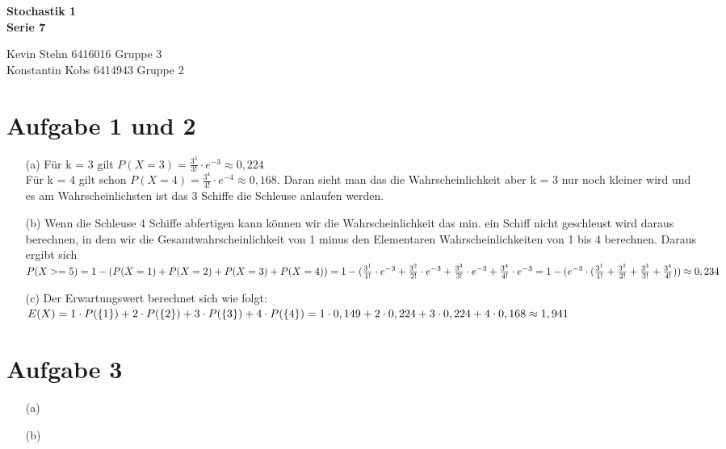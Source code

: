 \documentclass[10pt,a4paper]{article}
\begin{document}
\begin{center}
\textbf{Stochastik 1 \\ Serie 7 \\}
\end{center}

\begin{flushright}
Kevin Stehn 6416016 Gruppe 3 \\
Konstantin Kobs 6414943 Gruppe 2
\end{flushright}

\section*{Aufgabe 1 und 2}
\begin{itemize}
\item[(a)] Für k = 3 gilt $P(X=3) = \frac{3^3}{3!}\cdot e^{-3} \approx 0,224$ \\
Für k = 4 gilt schon $P(X=4) = \frac{3^4}{4!}\cdot e^{-4} \approx 0,168$. Daran sieht man das die Wahrscheinlichkeit aber k = 3 nur noch kleiner wird und es am Wahrscheinlichsten ist das 3 Schiffe die Schleuse anlaufen werden.
\item[(b)] Wenn die Schleuse 4 Schiffe abfertigen kann können wir die Wahrscheinlichkeit das min. ein Schiff nicht geschleust wird daraus berechnen, in dem wir die Gesamtwahrscheinlichkeit von 1 minus den Elementaren Wahrscheinlichkeiten von 1 bis 4 berechnen. Daraus ergibt sich\\
$P(X>=5) = 1- ( P(X=1)+ P(X=2)+P(X=3)+P(X=4))\newline
= 1- (\frac{3^1}{1!}\cdot e^{-3} + \frac{3^2}{2!}\cdot e^{-3} +\frac{3^3}{3!}\cdot e^{-3} + \frac{3^4}{4!}\cdot e^{-3} \newline
= 1-(e^{-3} \cdot (\frac{3^1}{1!} +\frac{3^2}{2!} +\frac{3^3}{3!} +\frac{3^4}{4!}))\approx 0,234$
\item[(c)] Der Erwartungswert berechnet sich wie folgt:\\
$E(X)= 1\cdot P(\{1\})+2\cdot P(\{2\})+3\cdot P(\{3\})+4\cdot P(\{4\}) \newline
= 1\cdot 0,149 + 2\cdot 0,224+3\cdot 0,224+4\cdot 0,168 \approx 1,941$
\end{itemize}


\section*{Aufgabe 3}
\begin{itemize}
\item[(a)]
\item[(b)]
\end{itemize}
\end{document}
